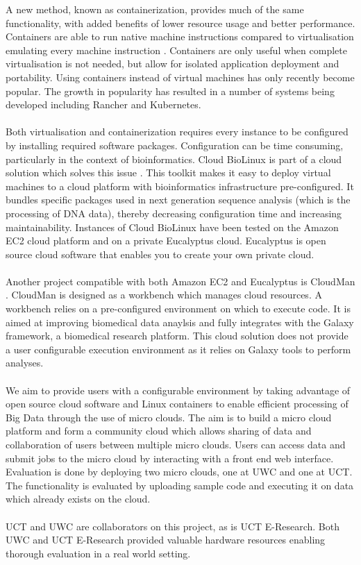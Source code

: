 \documentclass{sig-alternate-05-2015}
\begin{document}
A new method, known as containerization, provides much of the same functionality, with added benefits of lower resource usage and better performance. Containers are able to run native machine instructions compared to virtualisation emulating every machine instruction \cite{dua2014virtualization}. Containers are only useful when complete virtualisation is not needed, but allow for isolated application deployment and portability. Using containers instead of virtual machines has only recently become popular. The growth in popularity has resulted in a number of systems being developed including Rancher and Kubernetes. 
\\\\
Both virtualisation and containerization requires every instance to be configured by installing required software packages. Configuration can be time consuming, particularly in the context of bioinformatics. Cloud BioLinux is part of a cloud solution which solves this issue \cite{krampis2012cloud}. This toolkit makes it easy to deploy virtual machines to a cloud platform with bioinformatics infrastructure pre-configured. It bundles specific packages used in next generation sequence analysis (which is the processing of DNA data), thereby decreasing configuration time and increasing maintainability. Instances of Cloud BioLinux have been tested on the Amazon EC2 cloud platform and on a private Eucalyptus cloud. Eucalyptus is open source cloud software that enables you to create your own private cloud.
\\\\
Another project compatible with both Amazon EC2 and Eucalyptus is CloudMan \cite{afgan2015building}. CloudMan is designed as a workbench which manages cloud resources. A workbench relies on a pre-configured environment on which to execute code. It is aimed at improving biomedical data anaylsis and fully integrates with the Galaxy framework, a biomedical research platform. This cloud solution does not provide a user configurable execution environment as it relies on Galaxy tools to perform analyses. 
\\\\
We aim to provide users with a configurable environment by taking advantage of open source cloud software and Linux containers to enable efficient processing of Big Data through the use of micro clouds. The aim is to build a micro cloud platform and form a community cloud which allows sharing of data and collaboration of users between multiple micro clouds. Users can access data and submit jobs to the micro cloud by interacting with a front end web interface. Evaluation is done by deploying two micro clouds, one at UWC and one at UCT. The functionality is evaluated by uploading sample code and executing it on data which already exists on the cloud.
\\\\
UCT and UWC are collaborators on this project, as is UCT E-Research. Both UWC and UCT E-Research provided valuable hardware resources enabling thorough evaluation in a real world setting.
\end{document}
